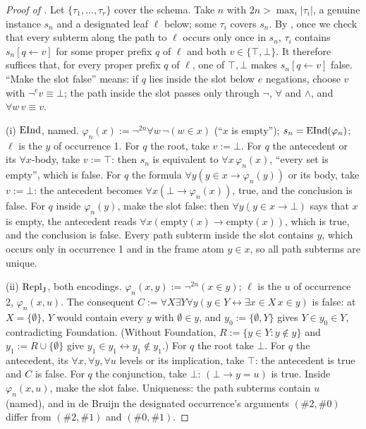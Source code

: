\begin{proof}[Proof of ]
Let $\{\tau_1,\dots,\tau_r\}$ cover the schema. Take $n$ with $2n>\max_i|\tau_i|$, a genuine instance $s_n$ and a
designated leaf $\ell$ below; some $\tau_i$ covers $s_n$. By , once we check that every subterm
along the path to $\ell$ occurs only once in $s_n$, $\tau_i$ contains $s_n[q\leftarrow v]$ for some proper prefix $q$
of $\ell$ and both $v\in\{\top,\bot\}$. It therefore suffices that, for every proper prefix $q$ of $\ell$, one of $\top,\bot$
makes $s_n[q\leftarrow v]$ false. ``Make the slot false'' means: if $q$ lies inside the slot below $e$ negations, choose
$v$ with $\neg^e v\equiv\bot$; the path inside the slot passes only through $\neg$, $\forall$ and $\wedge$, and
$\forall w\,v\equiv v$.

(i) $\mathrm{EInd}$, named. $\varphi_n(x):=\neg^{2n}\forall w\,\neg(w\in x)$ (``$x$ is empty''); $s_n=\mathrm{EInd}(\varphi_n)$; $\ell$ is
the $y$ of occurrence 1. For $q$ the root, take $v:=\bot$. For $q$ the antecedent or its $\forall x$-body, take
$v:=\top$: then $s_n$ is equivalent to $\forall x\,\varphi_n(x)$, ``every set is empty'', which is false. For $q$ the
formula $\forall y(y\in x\to\varphi_n(y))$ or its body, take $v:=\bot$: the antecedent becomes
$\forall x(\bot\to\varphi_n(x))$, true, and the conclusion is false. For $q$ inside $\varphi_n(y)$, make the slot false:
then $\forall y(y\in x\to\bot)$ says that $x$ is empty, the antecedent reads $\forall x(\mathrm{empty}(x)\to
\mathrm{empty}(x))$, which is true, and the conclusion is false. Every path subterm inside the slot contains $y$, which
occurs only in occurrence 1 and in the frame atom $y\in x$, so all path subterms are unique.

(ii) $\mathrm{Repl}_{\mathrm{J}}$, both encodings. $\varphi_n(x,y):=\neg^{2n}(x\in y)$; $\ell$ is the $u$ of occurrence 2, $\varphi_n(x,u)$.
The consequent $C:=\forall X\exists Y\forall y(y\in Y\leftrightarrow\exists x{\in}X\,x\in y)$ is false: at
$X=\{\emptyset\}$, $Y$ would contain every $y$ with $\emptyset\in y$, and $y_0:=\{\emptyset,Y\}$ gives $Y\in y_0\in Y$,
contradicting Foundation. (Without Foundation, $R:=\{y\in Y:y\notin y\}$ and $y_1:=R\cup\{\emptyset\}$ give $y_1\in
y_1\leftrightarrow y_1\notin y_1$.) For $q$ the root take $\bot$. For $q$ the antecedent, its $\forall x,\forall
y,\forall u$ levels or its implication, take $\top$: the antecedent is true and $C$ is false. For $q$ the conjunction,
take $\bot$: $(\bot\to y=u)$ is true. Inside $\varphi_n(x,u)$, make the slot false. Uniqueness: the path subterms
contain $u$ (named), and in de Bruijn the designated occurrence's arguments $(\#2,\#0)$ differ from $(\#2,\#1)$ and
$(\#0,\#1)$.


\end{proof}

